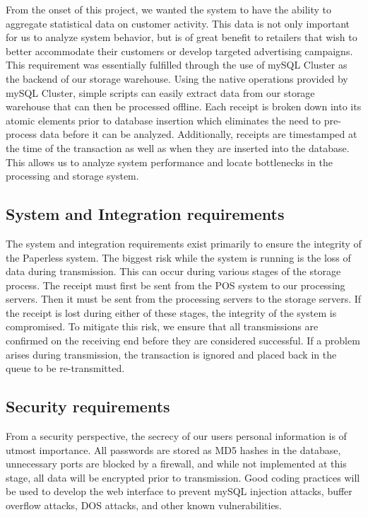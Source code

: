 From the onset of this project, we wanted the system to have the ability to aggregate statistical data on customer activity.  This data is not only important for us to analyze system behavior, but is of great benefit to retailers that wish to better accommodate their customers or develop targeted advertising campaigns.  This requirement was essentially fulfilled through the use of mySQL Cluster as the backend of our storage warehouse.  Using the native operations provided by mySQL Cluster, simple scripts can easily extract data from our storage warehouse that can then be processed offline.  Each receipt is broken down into its atomic elements prior to database insertion which eliminates the need to pre-process data before it can be analyzed.  Additionally, receipts are timestamped at the time of the transaction as well as when they are inserted into the database.  This allows us to analyze system performance and locate bottlenecks in the processing and storage system.

\subsection{System and Integration requirements}
\label{sec:requirements.system}

The system and integration requirements exist primarily to ensure the integrity of the Paperless system.  The biggest risk while the system is running is the loss of data during transmission.  This can occur during various stages of the storage process.  The receipt must first be sent from the POS system to our processing servers.  Then it must be sent from the processing servers to the storage servers.  If the receipt is lost during either of these stages, the integrity of the system is compromised.  To mitigate this risk, we ensure that all transmissions are confirmed on the receiving end before they are considered successful.  If a problem arises during transmission, the transaction is ignored and placed back in the queue to be re-transmitted.

\subsection{Security requirements}
\label{sec:requirements.security}

From a security perspective, the secrecy of our users personal information is of utmost importance.  All passwords are stored as MD5 hashes in the database, unnecessary ports are blocked by a firewall, and while not implemented at this stage, all data will be encrypted prior to transmission.  Good coding practices will be used to develop the web interface to prevent mySQL injection attacks, buffer overflow attacks, DOS attacks, and other known vulnerabilities.

